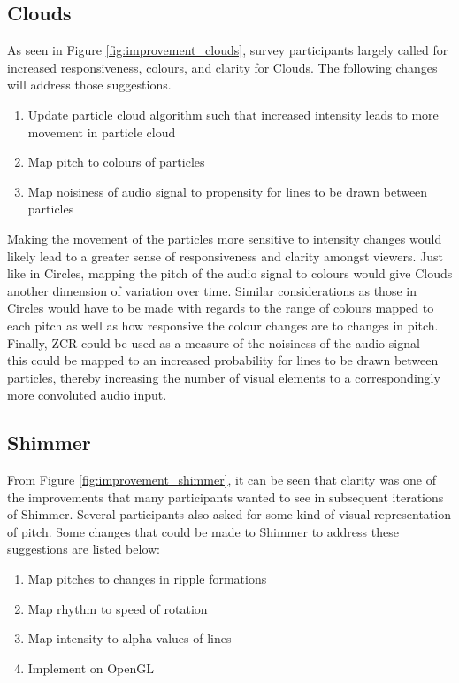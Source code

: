 \documentclass[../initial_thesis.tex]{subfiles}
\begin{document}
\subsection{Clouds}
As seen in Figure \ref{fig:improvement_clouds}, survey participants largely called for increased responsiveness, colours, and clarity for Clouds. The following changes will address those suggestions.

\begin{enumerate}
\item {Update particle cloud algorithm such that increased intensity leads to more movement in particle cloud}
\item {Map pitch to colours of particles}
\item {Map noisiness of audio signal to propensity for lines to be drawn between particles}
\end{enumerate}

Making the movement of the particles more sensitive to intensity changes would likely lead to a greater sense of responsiveness and clarity amongst viewers. Just like in Circles, mapping the pitch of the audio signal to colours would give Clouds another dimension of variation over time. Similar considerations as those in Circles would have to be made with regards to the range of colours mapped to each pitch as well as how responsive the colour changes are to changes in pitch. Finally, ZCR could be used as a measure of the noisiness of the audio signal --- this could be mapped to an increased probability for lines to be drawn between particles, thereby increasing the number of visual elements to a correspondingly more convoluted audio input. 

\subsection{Shimmer}
From Figure \ref{fig:improvement_shimmer}, it can be seen that clarity was one of the improvements that many participants wanted to see in subsequent iterations of Shimmer. Several participants also asked for some kind of visual representation of pitch. Some changes that could be made to Shimmer to address these suggestions are listed below:

\begin{enumerate}
\item {Map pitches to changes in ripple formations}
\item {Map rhythm to speed of rotation}
\item {Map intensity to alpha values of lines}
\item {Implement on OpenGL}
\end{enumerate}
\end{document}
